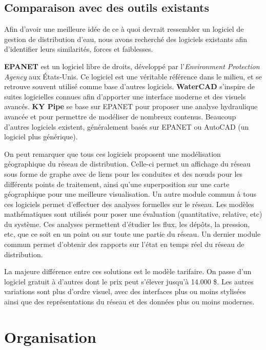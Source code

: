 \documentclass{EPL-master-thesis-covers-FR}
\begin{document}
		\section{Comparaison avec des outils existants}

			Afin d'avoir une meilleure idée de ce à quoi devrait ressembler un logiciel de gestion de distribution d'eau, nous avons recherché des logiciels existants afin d'identifier leurs similarités, forces et faiblesses.

			\textbf{EPANET} est un logiciel libre de droits, développé par l'\emph{Environment Protection Agency} aux États-Unis. Ce logiciel est une véritable référence dans le milieu, et se retrouve souvent utilisé comme base d'autres logiciels. \textbf{WaterCAD} s'inspire de suites logicielles connues afin d'apporter une interface moderne et des visuels avancés. \textbf{KY Pipe} se base sur EPANET pour proposer une analyse hydraulique avancée et pour permettre de modéliser de nombreux contenus. Beaucoup d'autres logiciels existent, généralement basés sur EPANET ou AutoCAD (un logiciel plus générique).

			On peut remarquer que tous ces logiciels proposent une modélisation géographique du réseau de distribution. Celle-ci permet un affichage du réseau sous forme de graphe avec de liens pour les conduites et des nœuds pour les différents points de traitement, ainsi qu'une superposition sur une carte géographique pour une meilleure visualisation. Un autre module commun à tous ces logiciels permet d'effectuer des analyses formelles sur le réseau. Les modèles mathématiques sont utilisés pour poser une évaluation (quantitative, relative, etc) du système. Ces analyses permettent d'étudier les flux, les dépôts, la pression, etc, que ce soit en un point ou sur toute une partie du réseau. Un dernier module commun permet d'obtenir des rapports sur l'état en temps réel du réseau de distribution.

			La majeure différence entre ces solutions est le modèle tarifaire. On passe d'un logiciel gratuit à d'autres dont le prix peut s'élever jusqu'à 14.000 \$. Les autres variations sont plus d'ordre visuel, avec des interfaces plus ou moins stylisées ainsi que des représentations du réseau et des données plus ou moins modernes.

	\chapter{Organisation}
\end{document}
